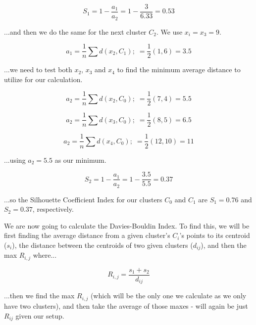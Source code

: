 \documentclass{article}
\begin{document}
\begin{equation}
    S_1 = 1 - \frac{a_1}{a_2} = 1 - \frac{3}{6.33} = 0.53
\end{equation}

\noindent ...and then we do the same for the next cluster $C_2$. We use $x_i=x_3=9$.

\begin{equation}
    a_1 = \frac{1}{n} \sum d(x_2, C_1); \; = \frac{1}{2} (1, 6) = 3.5
\end{equation}

\noindent ...we need to test both $x_2$, $x_3$ and $x_4$ to find the minimum average distance to utilize for our calculation.

\begin{equation}
    a_2 = \frac{1}{n} \sum d(x_2, C_0); \; = \frac{1}{2} (7, 4) = 5.5
\end{equation}

\begin{equation}
    a_2 = \frac{1}{n} \sum d(x_3, C_0); \; = \frac{1}{2} (8, 5) = 6.5
\end{equation}

\begin{equation}
    a_2 = \frac{1}{n} \sum d(x_4, C_0); \; = \frac{1}{2} (12, 10) = 11
\end{equation}

\noindent ...using $a_2=5.5$ as our minimum.

\begin{equation}
    S_2 = 1- \frac{a_1}{a_2} = 1 - \frac{3.5}{5.5} = 0.37
\end{equation}

\noindent ...so the Silhouette Coefficient Index for our clusters $C_0$ and $C_1$ are $S_1=0.76$ and $S_2=0.37$, respectively.


We are now going to calculate the Davies-Bouldin Index. To find this, we will be first finding the average distance from a given cluster's $C_i$'s points to its centroid ($s_i$), the distance between the centroids of two given clusters ($d_{ij}$), and then the max $R_{i,j}$ where...

\begin{equation}
    R_{i,j} = \frac{s_1+s_2}{d_{ij}}
\end{equation}

\noindent ...then we find the max $R_{i,j}$ (which will be the only one we calculate as we only have two clusters), and then take the average of those maxes - will again be just $R_{ij}$ given our setup.
\end{document}
